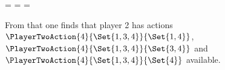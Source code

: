     \startformula
        \startalign[n=2,align={left,left}]
            \NC {}
            \NC = 
            \NR
            \NC {}
            \NC = 
            \NR
            \NC {}
            \NC = 
            \NR
        \stopalign
    \stopformula

    From that one finds that player 2 has actions $\PlayerTwoAction{4}{\Set{1, 3, 4}}{\Set{1, 4}}$, $\PlayerTwoAction{4}{\Set{1, 3, 4}}{\Set{3, 4}}$ and $\PlayerTwoAction{4}{\Set{1, 3, 4}}{\Set{4}}$ available.

\stopsubsection


